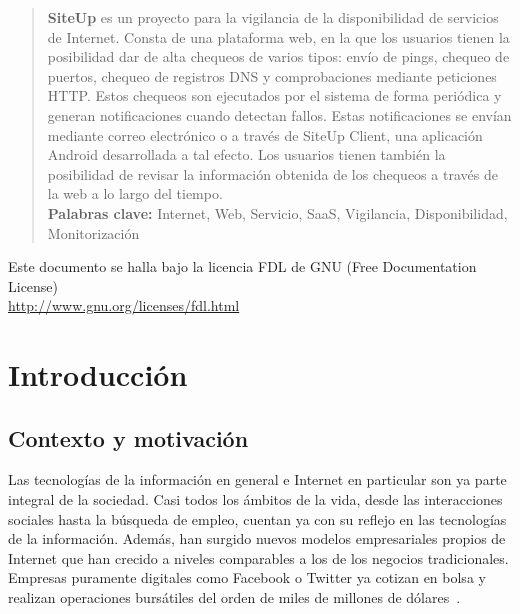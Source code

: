 \documentclass[a4paper,12pt]{article}
\begin{document}
\portada

\vspace{0.25cm}

\begin{abstract}
\textbf{SiteUp} es un proyecto para la vigilancia de la disponibilidad
  de servicios de Internet. Consta de una plataforma web, en la que los usuarios
  tienen la posibilidad dar de alta chequeos de varios tipos: envío de pings,
  chequeo de puertos, chequeo de registros DNS y comprobaciones mediante
  peticiones HTTP. Estos chequeos son ejecutados por el sistema de forma
  periódica y generan notificaciones cuando detectan fallos. Estas
  notificaciones se envían mediante correo electrónico o a través de SiteUp
  Client, una aplicación Android desarrollada a tal efecto. Los usuarios tienen
  también la posibilidad de revisar la información obtenida de los chequeos a
  través de la web a lo largo del tiempo. \\

  \textbf{Palabras clave:} Internet, Web, Servicio, SaaS, Vigilancia,
  Disponibilidad, Monitorización

\end{abstract}


\vspace{0.5cm}

\begin{center}
{\footnotesize Este documento se halla bajo la licencia FDL de GNU (Free Documentation
  License)\\ \url{http://www.gnu.org/licenses/fdl.html} }   
\end{center}



\tableofcontents

\section{Introducción}

\subsection{Contexto y motivación}

Las tecnologías de la información en general e Internet en particular son ya
parte integral de la sociedad. Casi todos los ámbitos de la vida, desde las
interacciones sociales hasta la búsqueda de empleo, cuentan ya con su reflejo en
las tecnologías de la información. Además, han surgido nuevos modelos
empresariales propios de Internet que han crecido a niveles comparables a los de
los negocios tradicionales. Empresas puramente digitales como Facebook o Twitter
ya cotizan en bolsa y realizan operaciones bursátiles del orden de miles de
millones de dólares~\cite{facebook-acquires-whatsapp}.
\end{document}
